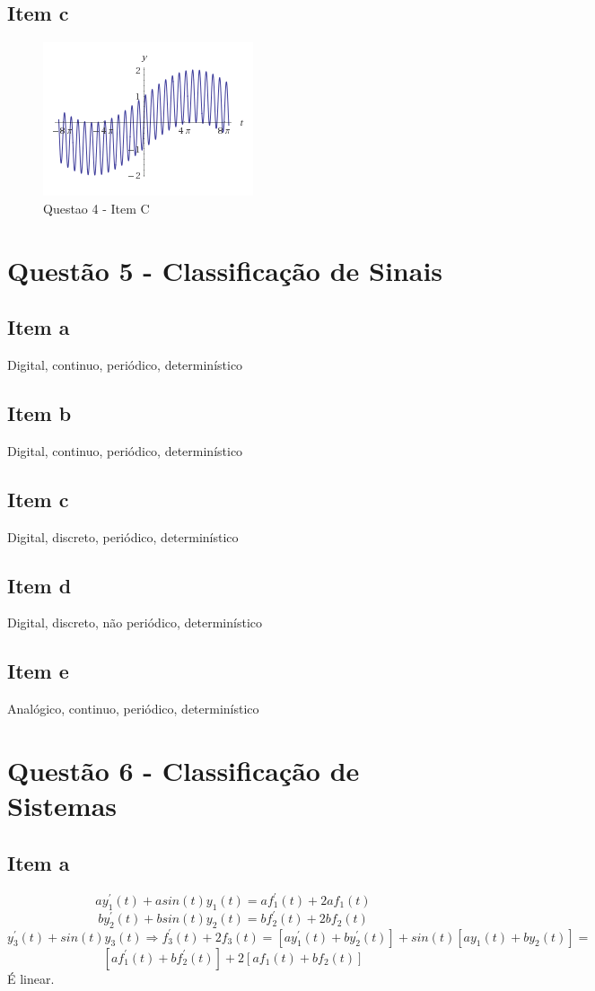 \documentclass[a4paper, 12pt]{article}
\begin{document}
        \subsection{Item c}
            \begin{figure}[!ht]
            	\centering
            	\includegraphics{img/Figura8.PNG}
            	\caption{Questao 4 - Item C}
            \end{figure}          
    \section{Quest\~{a}o 5 - Classificação de Sinais}
        \subsection{Item a}
        Digital, continuo, periódico, determinístico 
        \subsection{Item b}
        Digital, continuo, periódico, determinístico 
        \subsection{Item c} 
        Digital, discreto, periódico, determinístico   
        \subsection{Item d} 
        Digital, discreto, não periódico, determinístico
        \subsection{Item e} 
        Analógico, continuo, periódico, determinístico
    \section{Quest\~{a}o 6 - Classificação de Sistemas}
        \subsection{Item a}
        \[ay_{1}^{'}(t) + asin(t)y_{1}(t) = af_{1}^{'}(t) + 2af_{1}(t)\]
        \[by_{2}^{'}(t) + bsin(t)y_{2}(t) = bf_{2}^{'}(t) + 2bf_{2}(t)\]
        \[y_{3}^{'}(t) + sin(t)y_{3}(t) \Rightarrow f_{3}^{'}(t) + 2f_{3}(t) = [ay_{1}^{'}(t)  + by_{2}^{'}(t)] + sin(t)[ay_{1}(t) + by_{2}(t)] = \] 
        \[[af_{1}^{'}(t) + bf_{2}^{'}(t)] + 2[af_{1}(t) + bf_{2}(t)]\]
        É linear.
\end{document}
